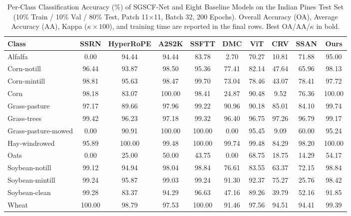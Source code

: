 \documentclass[manuscript,screen,review]{acmart}
\begin{document}
\begin{table}[tbp]
\centering
\scriptsize
\setlength{\tabcolsep}{3.5pt}
\caption{Per-Class Classification Accuracy (\%) of SGSCF-Net and Eight Baseline Models on the Indian Pines Test Set (10\% Train / 10\% Val / 80\% Test, Patch 11$\times$11, Batch 32, 200 Epochs). Overall Accuracy (OA), Average Accuracy (AA), Kappa ($\kappa \times 100$), and training time are reported in the final rows. Best OA/AA/$\kappa$ in bold.}
\label{tab:perclass_ip}
\begin{tabular}{p{3.0cm}ccccccccc}
\toprule
\textbf{Class} & \textbf{SSRN} & \textbf{HyperRoPE} & \textbf{A2S2K} & \textbf{SSFTT} & \textbf{DMC} & \textbf{ViT} & \textbf{CRV} & \textbf{SSAN} & \textbf{Ours} \\
\midrule
Alfalfa                      & 0.00 & 94.44 & 94.44 & 83.78 & 2.70 & 70.27 & 10.81 & 71.88 & 95.00 \\
Corn-notill                  & 96.44 & 93.87 & 98.50 & 95.36 & 77.41 & 82.14 & 47.64 & 65.96 & 98.13 \\
Corn-mintill                 & 98.81 & 95.63 & 98.47 & 99.70 & 73.04 & 78.46 & 43.07 & 78.41 & 97.72 \\
Corn                         & 98.18 & 83.07 & 100.00 & 98.41 & 24.87 & 90.48 & 9.52 & 76.36 & 100.00 \\
Grass-pasture                & 97.17 & 89.66 & 97.96 & 99.22 & 90.96 & 90.18 & 85.01 & 84.10 & 99.74 \\
Grass-trees                  & 99.42 & 96.23 & 97.18 & 99.32 & 96.40 & 96.75 & 97.26 & 96.79 & 99.17 \\
Grass-pasture-mowed          & 0.00 & 90.91 & 100.00 & 100.00 & 0.00 & 95.45 & 9.09 & 60.00 & 95.24 \\
Hay-windrowed                & 95.89 & 100.00 & 99.48 & 100.00 & 99.74 & 99.48 & 84.29 & 98.20 & 100.00 \\
Oats                         & 0.00 & 25.00 & 50.00 & 43.75 & 0.00 & 68.75 & 18.75 & 14.29 & 54.17 \\
Soybean-notill               & 99.12 & 94.94 & 98.04 & 98.84 & 76.61 & 83.55 & 63.37 & 72.15 & 98.84 \\
Soybean-mintill              & 99.24 & 95.87 & 99.03 & 99.24 & 91.30 & 92.37 & 75.27 & 25.76 & 98.42 \\
Soybean-clean                & 99.28 & 83.37 & 94.29 & 96.63 & 47.16 & 89.26 & 39.79 & 52.16 & 91.85 \\
Wheat                        & 100.00 & 98.79 & 97.53 & 100.00 & 91.46 & 97.56 & 94.51 & 94.41 & 99.39 \\

\end{tabular}
\end{table}
\end{document}
